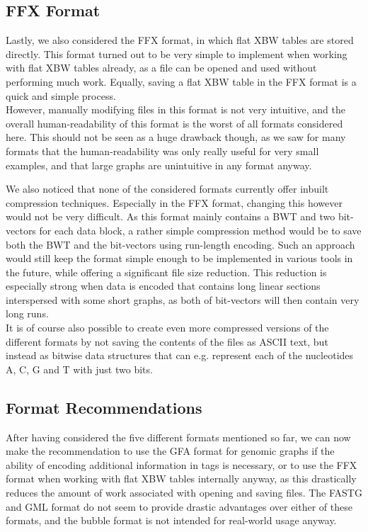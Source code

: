\documentclass[a4paper,12pt,twoside,BCOR=10mm]{scrbook}
\begin{document}
\subsection{FFX Format}

Lastly, we also considered the FFX format, in which flat XBW tables are stored directly.
This format turned out to be very simple to implement when working with flat XBW tables already,
as a file can be opened and used without performing much work. Equally, saving a flat XBW table
in the FFX format is a quick and simple process. \\
However, manually modifying files in this format is not very intuitive,
and the overall human-readability of this format is the worst of all formats considered here.
This should not be seen as a huge drawback though, as we saw for many formats that the human-readability was
only really useful for very small examples, and that large graphs are unintuitive in any format anyway.

We also noticed that none of the considered formats currently offer inbuilt compression techniques.
Especially in the FFX format, changing this however would not be very difficult.
As this format mainly contains a BWT and two bit-vectors for each data block,
a rather simple compression method would be to save both the BWT and the bit-vectors
using run-length encoding.
Such an approach would still keep the format simple enough to be implemented in various
tools in the future, while offering a significant file size reduction.
This reduction is especially strong when data is encoded that contains long linear sections
interspersed with some short graphs, as both of bit-vectors will then
contain very long runs. \\
It is of course also possible to create even more compressed versions
of the different formats by not saving the contents of the files as ASCII text,
but instead as bitwise data structures that can e.g. represent each of the nucleotides A, C, G and T with
just two bits.

\subsection{Format Recommendations}

After having considered the five different formats mentioned so far,
we can now make the recommendation to use the GFA format for genomic graphs
if the ability of encoding additional information in tags is necessary,
or to use the FFX format when working with flat XBW tables internally anyway,
as this drastically reduces the amount of work associated with opening and saving files.
The FASTG and GML format do not seem to provide drastic advantages over either of these formats,
and the bubble format is not intended for real-world usage anyway.
\end{document}
